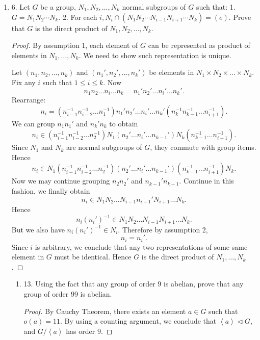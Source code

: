 \begin{enumerate}[resume]
\item 6. Let $G$ be a group, $N_1, N_2, \ldots, N_k$ normal subgroups of $G$ such that:
1. $G=N_1 N_2 \cdots N_k$.
2. For each $i, N_i \cap\left(N_1 N_2 \cdots N_{i-1} N_{i+1} \cdots N_k\right)=(e)$.
Prove that $G$ is the direct product of $N_1, N_2, \ldots, N_k$.
\begin{proof}
	By assumption 1, each element of $G$ can be represented as product of elements in $N_1, \ldots, N_k$. We need to show such representation is unique.

	Let $(n_1,n_2,\ldots,n_k)$ and $(n_1',n_2',\ldots,n_k')$ be elements in $N_1 \times N_2\times \ldots\times N_k$. Fix any $i$ such that $1\le i\le k$. Now
	\[
		n_1n_2\ldots n_i \ldots n_k
		= n_1'n_2'\ldots n_i' \ldots n_k'
	.\] 
	Rearrange:
\[
		n_i= \left( n_{i-1}^{-1}n_{i-2}^{-1}\ldots n_1^{-1} \right)  n_1'n_2'\ldots n_i' \ldots n_k' \left( n_{k}^{-1} n_{k-1}^{-1} \ldots n_{i+1}^{-1} \right) 
	.\]
	We can group $n_1n_1'$ and $n_k'n_k$ to obtain
\[
		n_i\in  \left( n_{i-1}^{-1}n_{i-2}^{-1}\ldots n_2^{-1} \right)  N_1 (n_2'\ldots n_i' \ldots n_{k-1}')N_k \left( n_{k-1}^{-1} \ldots n_{i+1}^{-1} \right) 
	.\]
	Since $N_1$ and $N_k$ are normal subgroups of $G$, they commute with group items. Hence
\[
		n_i\in  N_1\left( n_{i-1}^{-1}n_{i-2}^{-1}\ldots n_2^{-1} \right)  (n_2'\ldots n_i' \ldots n_{k-1}')\left( n_{k-1}^{-1} \ldots n_{i+1}^{-1} \right) N_k
	.\]
	Now we may continue grouping $n_2n_2'$ and $n_{k-1}' n_{k-1 }$. Continue in this fashion, we finally obtain
\[
		n_i\in  N_1 N_2 \ldots N_{i-1} n_{i-1}' N_{i+1}\ldots N_k
	.\]
	Hence
\[
		n_i (n_{i}')^{-1}\in  N_1 N_2 \ldots N_{i-1} N_{i+1}\ldots N_k
	.\]
	But we also have $n_i (n_{i}')^{-1} \in N_i$. Therefore by assumption 2, \[
		n_i = n_i'
	.\]
	Since $i$ is arbitrary, we conclude that any two representations of some same element in  $G$ must be identical. Hence $G$ is the direct product of $N_1, \ldots, N_k$.
\end{proof}

\newpage

\begin{enumerate}
	\item 13. Using the fact that any group of order 9 is abelian, prove that any group of order 99 is abelian.
\begin{proof}
	By Cauchy Theorem, there exists an element  $a \in G$ such that $o(a) = 11$. By using a counting argument, we conclude that $\left\langle a \right\rangle \triangleleft G$, and $G / \left\langle a \right\rangle $ has order $9$. 


\end{proof}
\end{enumerate}
\end{enumerate}
